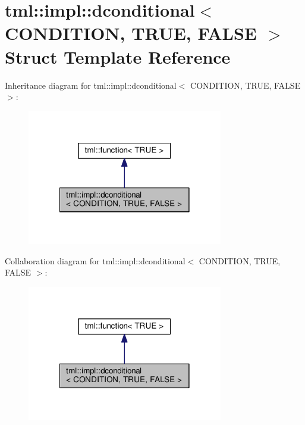 \hypertarget{structtml_1_1impl_1_1dconditional}{\section{tml\+:\+:impl\+:\+:dconditional$<$ C\+O\+N\+D\+I\+T\+I\+O\+N, T\+R\+U\+E, F\+A\+L\+S\+E $>$ Struct Template Reference}
\label{structtml_1_1impl_1_1dconditional}
}


Inheritance diagram for tml\+:\+:impl\+:\+:dconditional$<$ C\+O\+N\+D\+I\+T\+I\+O\+N, T\+R\+U\+E, F\+A\+L\+S\+E $>$\+:
\nopagebreak
\begin{figure}[H]
\begin{center}
\leavevmode
\includegraphics[width=242pt]{structtml_1_1impl_1_1dconditional__inherit__graph}
\end{center}
\end{figure}


Collaboration diagram for tml\+:\+:impl\+:\+:dconditional$<$ C\+O\+N\+D\+I\+T\+I\+O\+N, T\+R\+U\+E, F\+A\+L\+S\+E $>$\+:
\nopagebreak
\begin{figure}[H]
\begin{center}
\leavevmode
\includegraphics[width=242pt]{structtml_1_1impl_1_1dconditional__coll__graph}
\end{center}
\end{figure}
